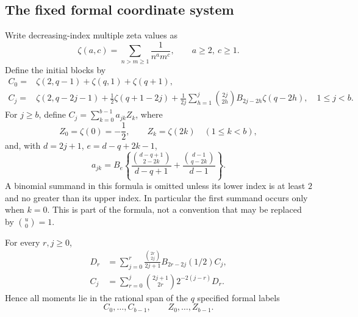 \subsection{The fixed formal coordinate system}

Write decreasing-index multiple zeta values as
\[
 \zeta(a,c)=\sum_{n>m\ge1}\frac1{n^a m^c},\qquad a\ge2,\ c\ge1.
\]
Define the initial blocks by
\begin{align}
 C_0={}&\zeta(2,q-1)+\zeta(q,1)+\zeta(q+1),
 \label{eq:C0-foundation}\\
 C_j={}&\zeta(2,q-2j-1)+\frac12\zeta(q+1-2j)
   +\frac1{2j}\sum_{h=1}^{j}\binom{2j}{2h}
                  B_{2j-2h}\zeta(q-2h),
 \quad 1\le j<b.\label{eq:Cinitial-foundation}
\end{align}
For $j\ge b$, define $C_j=\sum_{k=0}^{b-1}a_{jk}Z_k$, where
\begin{equation}\label{eq:coordinates-foundation}
 Z_0=\zeta(0)=-\frac12,\qquad Z_k=\zeta(2k)\quad(1\le k<b),
\end{equation}
and, with $d=2j+1$, $e=d-q+2k-1$,
\begin{equation}\label{eq:entries-foundation}
 a_{jk}=B_e\left\{
 \frac{\binom{d-q+1}{2-2k}}{d-q+1}
 +\frac{\binom{d-1}{q-2k}}{d-1}\right\}.
\end{equation}
A binomial summand in this formula is omitted unless its lower
index is at least $2$ and no greater than its upper index.
In particular the first summand occurs only when $k=0$.
This is part of the formula, not a convention that may be replaced
by $\binom u0=1$.

\begin{proposition}
\label{prop:tail-transform}
For every $r,j\ge0$,
\begin{align}
 D_r&=\sum_{j=0}^r
       \frac{\binom{2r}{2j}}{2j+1}B_{2r-2j}(1/2)C_j,
       \label{eq:forward-foundation}\\
 C_j&=\sum_{r=0}^j
       \binom{2j+1}{2r}2^{-2(j-r)}D_r.
       \label{eq:inverse-foundation}
\end{align}
Hence all moments lie in the rational span of the $q$ specified
formal labels
\[
 C_0,\ldots,C_{b-1},\qquad Z_0,\ldots,Z_{b-1}.
\]
\end{proposition}

